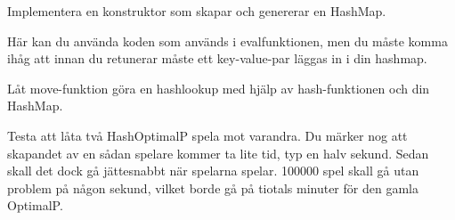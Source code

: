 \Subtask Implementera en konstruktor som skapar och genererar en HashMap.

Här kan du använda koden som används i evalfunktionen, men du måste komma ihåg att innan du retunerar måste ett key-value-par läggas in i din hashmap.

\Subtask Låt move-funktion göra en hashlookup med hjälp av hash-funktionen och din HashMap.

\Subtask Testa att låta två HashOptimalP spela mot varandra. Du märker nog att skapandet av en sådan spelare kommer ta lite tid, typ en halv sekund. Sedan skall det dock gå jättesnabbt när spelarna spelar. 100000 spel skall gå utan problem på någon sekund, vilket borde gå på tiotals minuter för den gamla OptimalP.